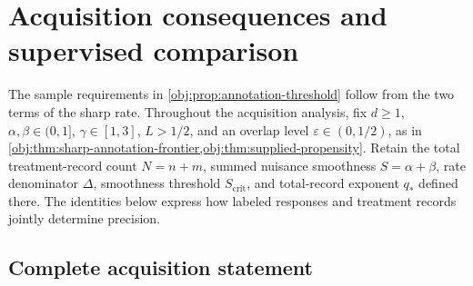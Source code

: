 \section{Acquisition consequences and supervised comparison}\label{sec:acquisition-consequences}

The sample requirements in \cref{obj:prop:annotation-threshold} follow from the two terms of the sharp rate. Throughout the acquisition analysis, fix \(d\ge1\), \(\alpha,\beta\in(0,1]\), \(\gamma\in[1,3]\), \(L>1/2\), and an overlap level \(\varepsilon\in(0,1/2)\), as in \cref{obj:thm:sharp-annotation-frontier,obj:thm:supplied-propensity}. Retain the total treatment-record count \(N=n+m\), summed nuisance smoothness \(S=\alpha+\beta\), rate denominator \(\Delta\), smoothness threshold \(S_{\mathrm{crit}}\), and total-record exponent \(q_*\) defined there. The identities below express how labeled responses and treatment records jointly determine precision.

\subsection{Complete acquisition statement}

